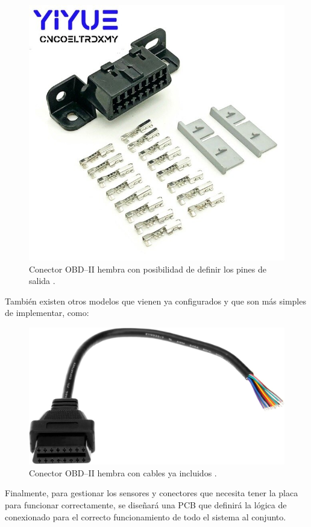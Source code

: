 \begin{figure}[H]
  \centering
  \includegraphics[width=\linewidth]{images/obd2-female.jpeg}
  \caption{Conector \ac{OBD}--II hembra con posibilidad de definir los pines de salida \cite{10DESCUENTOConector}.}
\end{figure}

También existen otros modelos que vienen ya configurados y que son más simples de
implementar, como:

\begin{figure}[H]
  \centering
  \includegraphics[width=\linewidth]{images/obd2-female-amazon.jpg}
  \caption{Conector \ac{OBD}--II hembra con cables ya incluidos \cite{AmazonComAupoko}.}
\end{figure}

Finalmente, para gestionar los sensores y conectores que necesita tener la placa para
funcionar correctamente, se diseñará una PCB que definirá la lógica de conexionado
para el correcto funcionamiento de todo el sistema al conjunto.
